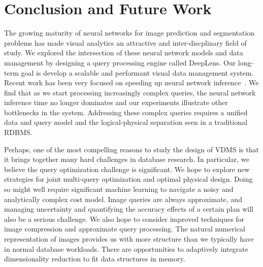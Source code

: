 \section{Conclusion and Future Work}
The growing maturity of neural networks for image prediction and segmentation problems has made visual analytics an attractive and inter-discplinary field of study.
We explored the intersection of these neural network models and data management by designing a query processing engine called \textsf{DeepLens}.
Our long-term goal is develop a scalable and performant visual data management system.
Recent work has been very focused on speeding up neural network inference~\cite{kang2017noscope, zhang2018ffs, anderson2018physical, jiang2018chameleon}.
We find that as we start processing increasingly complex queries, the neural network inference time no longer dominates and our experiments illustrate other bottlenecks in the system.
Addressing these complex queries requires a unified data and query model and the logical-physical separation seen in a traditional RDBMS.

Perhaps, one of the most compelling reasons to study the design of VDMS is that it brings together many hard challenges in database research. 
In particular, we believe the query optimization challenge is significant.
We hope to explore new strategies for joint multi-query optimization and optimal physical design. Doing so might well require significant machine learning to navigate a noisy and analytically complex cost model. 
Image queries are always approximate, and managing uncertainty and quantifying the accuracy effects of a certain plan will also be a serious challenge.
We also hope to consider improved techniques for image compression and approximate query processing.
The natural numerical representation of images provides us with more structure than we typically have in normal database workloads.
There are opportunities to adaptively integrate dimensionality reduction to fit data structures in memory.

